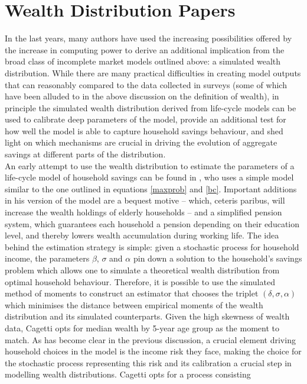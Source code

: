 \section{Wealth Distribution Papers}
In the last years, many authors have used the increasing possibilities offered
by the increase in computing power to derive an additional implication from the
broad class of incomplete market models outlined above: a simulated wealth 
distribution. While there are many practical difficulties in creating model 
outputs that can reasonably compared to the data collected in surveys (some of
which have been alluded to in the above discussion on the definition of wealth),
in principle the simulated wealth distribution derived from life-cycle models
can be used to calibrate deep parameters of the model, provide an additional
test for how well the model is able to capture household savings behaviour, 
and shed light on which mechanisms are crucial in driving the evolution of 
aggregate savings at different parts of the distribution. \\
An early attempt to use the wealth distribution to estimate the parameters of
a life-cycle model of household savings can be found in \citet{Cagetti2003},
who uses a simple model similar to the one outlined in equations \ref{maxprob}
and \ref{bc}. Important additions in his version of the model are a bequest 
motive -- which, ceteris paribus, will increase the wealth holdings of elderly
households -- and a simplified pension system, which guarantees each household
a pension depending on their education level, and thereby lowers wealth 
accumulation during working life. The idea behind the estimation strategy is 
simple: given a stochastic process for household income, the parameters $\beta$,
$\sigma$ and $\alpha$ pin down a solution to the household's savings problem 
which allows one to simulate a theoretical wealth distribution from optimal 
household behaviour. Therefore, it is possible to use the simulated method of
moments to construct an estimator that chooses the triplet $(\delta,\sigma, 
\alpha)$ which minimises the distance between empirical moments of the wealth
distribution and its simulated counterparts. Given the high skewness of wealth
data, Cagetti opts for median wealth by 5-year age group as the moment to match.
As has become clear in the previous discussion, a crucial element driving 
household choices in the model is the income risk they face, making the choice
for the stochastic process representing this risk and its calibration a crucial
step in modelling wealth distributions. Cagetti opts for a process consisting
